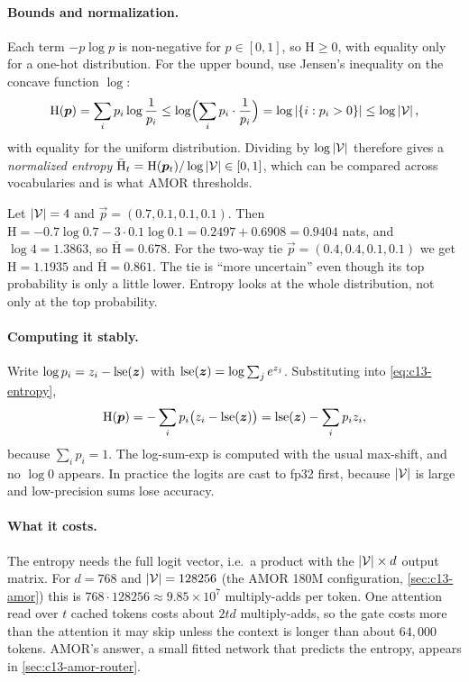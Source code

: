 \paragraph{Bounds and normalization.} Each term $-p\log p$ is non-negative for $p\in[0,1]$, so
$\mathrm{H}\ge 0$, with equality only for a one-hot distribution. For the upper bound, use Jensen's inequality on the
concave function $\log$:
\[
  \mathrm{H}(\bm{p}) = \sum_i p_i \log\frac{1}{p_i} \le \log\Bigl(\sum_i p_i\cdot\frac{1}{p_i}\Bigr)
  = \log \left\lvert \{i: p_i>0\}\right\rvert \le \log\left\lvert \mathcal{V}\right\rvert,
\]
with equality for the uniform distribution. Dividing by $\log\left\lvert \mathcal{V}\right\rvert$ therefore gives a
\emph{normalized entropy} $\bar{\mathrm{H}}_t = \mathrm{H}(\bm{p}_t)/\log\left\lvert \mathcal{V}\right\rvert\in[0,1]$, which can be compared
across vocabularies and is what AMOR thresholds.

\begin{example}\label{ex:c13-entropy}
Let $\left\lvert \mathcal{V}\right\rvert=4$ and $\vec{p}=(0.7,0.1,0.1,0.1)$. Then
$\mathrm{H}=-0.7\log 0.7-3\cdot 0.1\log 0.1 = 0.2497+0.6908=0.9404$ nats, and $\log 4=1.3863$, so
$\bar{\mathrm{H}}=0.678$. For the two-way tie $\vec{p}=(0.4,0.4,0.1,0.1)$ we get $\mathrm{H}=1.1935$ and
$\bar{\mathrm{H}}=0.861$. The tie is ``more uncertain'' even though its top probability is only a little lower.
Entropy looks at the whole distribution, not only at the top probability.
\end{example}

\paragraph{Computing it stably.} Write $\log p_i = z_i-\operatorname{lse}(\bm{z})$ with
$\operatorname{lse}(\bm{z})=\log\sum_j e^{z_j}$. Substituting into \eqref{eq:c13-entropy},
\begin{equation}\label{eq:c13-entropy-lse}
  \mathrm{H}(\bm{p}) = -\sum_i p_i\bigl(z_i-\operatorname{lse}(\bm{z})\bigr) = \operatorname{lse}(\bm{z})-\sum_i p_i z_i,
\end{equation}
because $\sum_i p_i=1$. The log-sum-exp is computed with the usual max-shift, and no $\log 0$ appears.
In practice the logits are cast to fp32 first, because $\left\lvert \mathcal{V}\right\rvert$ is large and low-precision
sums lose accuracy.

\paragraph{What it costs.} The entropy needs the full logit vector, i.e.\ a product with the
$\left\lvert \mathcal{V}\right\rvert\times d$ output matrix. For $d=768$ and $\left\lvert \mathcal{V}\right\rvert=128256$ (the AMOR 180M
configuration, \cref{sec:c13-amor}) this is $768\cdot 128256\approx 9.85\times 10^{7}$ multiply-adds per
token. One attention read over $t$ cached tokens costs about $2td$ multiply-adds, so the gate costs more
than the attention it may skip unless the context is longer than about $64{,}000$ tokens. AMOR's answer, a small
fitted network that predicts the entropy, appears in \cref{sec:c13-amor-router}.

